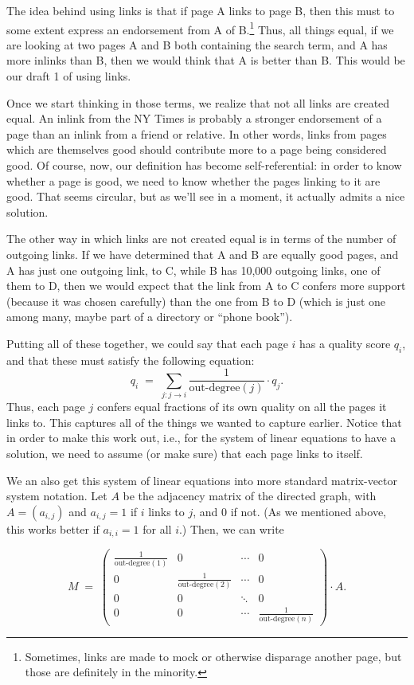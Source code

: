 The idea behind using links is that if page A links to page B, then
this must to some extent express an endorsement from A of
B.\footnote{Sometimes, links are made to mock or otherwise disparage
  another page, but those are definitely in the minority.}
Thus, all things equal, if we are looking at two pages A and B both
containing the search term, and A has more inlinks than B, then we
would think that A is better than B. This would be our draft 1 of
using links.

Once we start thinking in those terms, we realize that not all links
are created equal. An inlink from the NY Times is probably a stronger
endorsement of a page than an inlink from a friend or relative. In other
words, links from pages which are themselves good should contribute
more to a page being considered good. Of course, now, our definition
has become self-referential: in order to know whether a page is good,
we need to know whether the pages linking to it are good. That seems
circular, but as we'll see in a moment, it actually admits a nice
solution.

The other way in which links are not created equal is in terms of the
number of outgoing links. If we have determined that A and B are
equally good pages, and A has just one outgoing link, to C, while B
has 10,000 outgoing links, one of them to D, then we would expect that
the link from A to C confers more support (because it was chosen
carefully) than the one from B to D (which is just one among many,
maybe part of a directory or ``phone book'').

Putting all of these together, we could say that each page $i$ has a
quality score $q_i$, and that these must satisfy the following
equation:
\[ 
q_i \; = \; \sum_{j: j \to i} \frac{1}{\text{out-degree}(j)} \cdot q_j.
\]
Thus, each page $j$ confers equal fractions of its own quality on all
the pages it links to. This captures all of the things we wanted to
capture earlier. Notice that in order to make this work out, i.e., for
the system of linear equations to have a solution, we need to assume
(or make sure) that each page links to itself.

We an also get this system of linear equations into more standard
matrix-vector system notation. Let $A$ be the adjacency matrix of the
directed graph, with $A=(a_{i,j})$ and $a_{i,j} = 1$ if $i$ links to
$j$, and 0 if not. (As we mentioned above, this works better if
$a_{i,i} = 1$ for all $i$.) Then, we can write 

\[ 
M \; = \; \left( \begin{array}{cccc}
\frac{1}{\text{out-degree}(1)} & 0 & \cdots & 0\\
0 & \frac{1}{\text{out-degree}(2)} & \cdots & 0\\
0 & 0 & \ddots & 0 \\
0 & 0 & \cdots & \frac{1}{\text{out-degree}(n)}
          \end{array} \right) \cdot A.
\]


